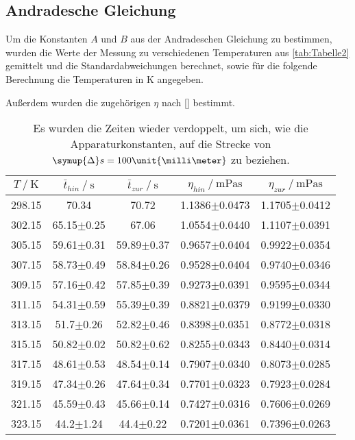 \subsection{Andradesche Gleichung}

Um die Konstanten $A$ und $B$ aus der Andradeschen Gleichung zu bestimmen, wurden die Werte der Messung zu verschiedenen Temperaturen aus \autoref{tab:Tabelle2}
gemittelt und die Standardabweichungen berechnet, sowie für die folgende
Berechnung die Temperaturen in $\unit{\kelvin}$ angegeben. 

Außerdem wurden die zugehörigen $\eta$ nach \eqref{} bestimmt.


\begin{table}[H]
  \centering
  \caption{Es wurden die Zeiten wieder verdoppelt, um sich, wie die Apparaturkonstanten, auf die Strecke 
  von $\symup{\Delta}s=100\unit{\milli\meter}$ zu beziehen.}
  \begin{tabular}{ccccc}
    \toprule
    {$T \mathbin{/} \unit{\kelvin}$} &
    {$\bar{t}_{hin} \mathbin{/} \unit{\second}$} &
    {$\bar{t}_{zur} \mathbin{/} \unit{\second}$} &
    {$\eta_{hin} \mathbin{/} \unit{\milli\pascal\second}$} &
    {$\eta_{zur} \mathbin{/} \unit{\milli\pascal\second}$} \\
    \midrule
    298.15 & 70.34          & 70.72          & 1.1386$\pm$0.0473 & 1.1705$\pm$0.0412 \\
    302.15 & 65.15$\pm$0.25 & 67.06          & 1.0554$\pm$0.0440 & 1.1107$\pm$0.0391 \\
    305.15 & 59.61$\pm$0.31 & 59.89$\pm$0.37 & 0.9657$\pm$0.0404 & 0.9922$\pm$0.0354 \\
    307.15 & 58.73$\pm$0.49 & 58.84$\pm$0.26 & 0.9528$\pm$0.0404 & 0.9740$\pm$0.0346 \\
    309.15 & 57.16$\pm$0.42 & 57.85$\pm$0.39 & 0.9273$\pm$0.0391 & 0.9595$\pm$0.0344 \\
    311.15 & 54.31$\pm$0.59 & 55.39$\pm$0.39 & 0.8821$\pm$0.0379 & 0.9199$\pm$0.0330 \\
    313.15 & 51.7$\pm$0.26  & 52.82$\pm$0.46 & 0.8398$\pm$0.0351 & 0.8772$\pm$0.0318 \\
    315.15 & 50.82$\pm$0.02 & 50.82$\pm$0.62 & 0.8255$\pm$0.0343 & 0.8440$\pm$0.0314 \\
    317.15 & 48.61$\pm$0.53 & 48.54$\pm$0.14 & 0.7907$\pm$0.0340 & 0.8073$\pm$0.0285 \\
    319.15 & 47.34$\pm$0.26 & 47.64$\pm$0.34 & 0.7701$\pm$0.0323 & 0.7923$\pm$0.0284 \\
    321.15 & 45.59$\pm$0.43 & 45.66$\pm$0.14 & 0.7427$\pm$0.0316 & 0.7606$\pm$0.0269 \\
    323.15 & 44.2$\pm$1.24  & 44.4$\pm$0.22  & 0.7201$\pm$0.0361 & 0.7396$\pm$0.0263 \\
    \bottomrule
  \end{tabular}
  \label{tab:Tabelle3}
\end{table}
